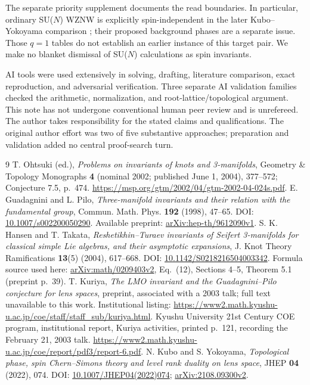 \documentclass[11pt]{article}
\begin{document}
The separate priority supplement documents the read boundaries. In
particular, ordinary SU($N$) WZNW is explicitly spin-independent in the
later Kubo--Yokoyama comparison \cite{KY}; their proposed background
phases are a separate issue. Those $q=1$ tables do not establish an
earlier instance of this target pair. We make no blanket dismissal of
SU($N$) calculations as spin invariants.

AI tools were used extensively in solving, drafting, literature
comparison, exact reproduction, and adversarial verification. Three
separate AI validation families checked the arithmetic, normalization,
and root-lattice/topological argument. This note has not undergone
conventional human peer review and is unrefereed. The author takes
responsibility for the stated claims and qualifications. The original
author effort was two of five substantive approaches; preparation and
validation added no central proof-search turn.

\begin{thebibliography}{9}
 T. Ohtsuki (ed.), \emph{Problems on invariants of knots and
3-manifolds}, Geometry \& Topology Monographs \textbf{4} (nominal 2002;
published June 1, 2004), 377--572; Conjecture 7.5, p.~474.
\url{https://msp.org/gtm/2002/04/gtm-2002-04-024s.pdf}.
 E. Guadagnini and L. Pilo, \emph{Three-manifold invariants
and their relation with the fundamental group}, Commun. Math. Phys.
\textbf{192} (1998), 47--65. DOI: \href{https://doi.org/10.1007/s002200050290}{10.1007/s002200050290}.
Available preprint: \href{https://arxiv.org/abs/hep-th/9612090v1}{arXiv:hep-th/9612090v1}.
 S. K. Hansen and T. Takata, \emph{Reshetikhin--Turaev
invariants of Seifert 3-manifolds for classical simple Lie algebras,
and their asymptotic expansions}, J. Knot Theory Ramifications
\textbf{13}(5) (2004), 617--668. DOI:
\href{https://doi.org/10.1142/S0218216504003342}{10.1142/S0218216504003342}.
Formula source used here: \href{https://arxiv.org/abs/math/0209403v2}{arXiv:math/0209403v2},
Eq.~(12), Sections 4--5, Theorem 5.1 (preprint p.~39).
 T. Kuriya, \emph{The LMO invariant and the Guadagnini--Pilo
conjecture for lens spaces}, preprint, associated with a 2003 talk;
full text unavailable to this work. Institutional listing:
\url{https://www2.math.kyushu-u.ac.jp/coe/staff/staff_sub/kuriya.html}.
 Kyushu University 21st Century COE program, institutional
report, Kuriya activities, printed p.~121, recording the February 21,
2003 talk. \url{https://www2.math.kyushu-u.ac.jp/coe/report/pdf3/report-6.pdf}.
 N. Kubo and S. Yokoyama, \emph{Topological phase, spin
Chern--Simons theory and level rank duality on lens space}, JHEP
\textbf{04} (2022), 074. DOI:
\href{https://doi.org/10.1007/JHEP04(2022)074}{10.1007/JHEP04(2022)074};
\href{https://arxiv.org/abs/2108.09300v2}{arXiv:2108.09300v2}.
\end{thebibliography}
\end{document}
